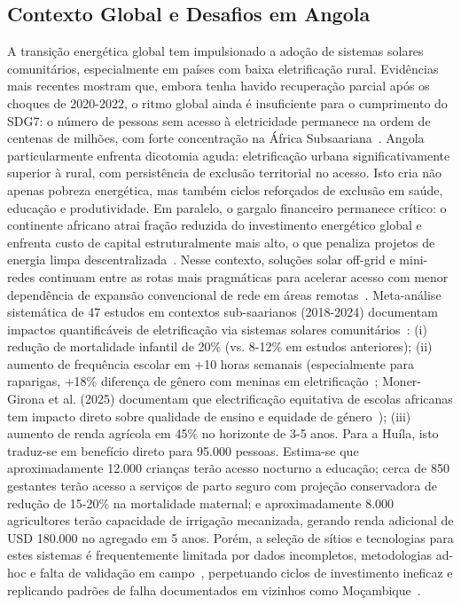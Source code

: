 \documentclass[12pt, a4paper]{article}
\begin{document}
\subsection{Contexto Global e Desafios em Angola}
A transição energética global tem impulsionado a adoção de sistemas solares comunitários, especialmente em países com baixa eletrificação rural. Evidências mais recentes mostram que, embora tenha havido recuperação parcial após os choques de 2020-2022, o ritmo global ainda é insuficiente para o cumprimento do SDG7: o número de pessoas sem acesso à eletricidade permanece na ordem de centenas de milhões, com forte concentração na África Subsaariana~\citep{IEA_Access2023,UN_SDG7_2025,TrackingSDG7_2025}. Angola particularmente enfrenta dicotomia aguda: eletrificação urbana significativamente superior à rural, com persistência de exclusão territorial no acesso.
Isto cria não apenas pobreza energética, mas também ciclos reforçados de exclusão em saúde, educação e produtividade. Em paralelo, o gargalo financeiro permanece crítico: o continente africano atrai fração reduzida do investimento energético global e enfrenta custo de capital estruturalmente mais alto, o que penaliza projetos de energia limpa descentralizada~\citep{IEA_FinancingAfrica2023}. Nesse contexto, soluções solar off-grid e mini-redes continuam entre as rotas mais pragmáticas para acelerar acesso com menor dependência de expansão convencional de rede em áreas remotas~\citep{Olaniyi2025,WorldBank2024}.
Meta-análise sistemática de 47 estudos em contextos sub-saarianos (2018-2024) documentam impactos quantificáveis de eletrificação via sistemas solares comunitários~\citep{Byaro2024}:
(i) redução de mortalidade infantil de 20\% (vs. 8-12\% em estudos anteriores);
(ii) aumento de frequência escolar em +10 horas semanais (especialmente para raparigas, +18\% diferença de gênero com meninas em eletrificação~\citep{Clark2021}; Moner-Girona et al. (2025) documentam que electrificação equitativa de escolas africanas tem impacto direto sobre qualidade de ensino e equidade de género~\citep{Moner2025});
(iii) aumento de renda agrícola em 45\% no horizonte de 3-5 anos. Para a Huíla, isto traduz-se em benefício direto para 95.000 pessoas. Estima-se que aproximadamente 12.000 crianças terão acesso nocturno a educação; cerca de 850 gestantes terão acesso a serviços de parto seguro com projeção conservadora de redução de 15-20\% na mortalidade maternal; e aproximadamente 8.000 agricultores terão capacidade de irrigação mecanizada, gerando renda adicional de USD 180.000 no agregado em 5 anos. Porém, a seleção de sítios e tecnologias para estes sistemas é frequentemente limitada por dados incompletos, metodologias ad-hoc e falta de validação em campo~\citep{IRENA2022, Lazard2023}, perpetuando ciclos de investimento ineficaz e replicando padrões de falha documentados em vizinhos como Moçambique~\citep{Ahlborg2014}.
\end{document}
